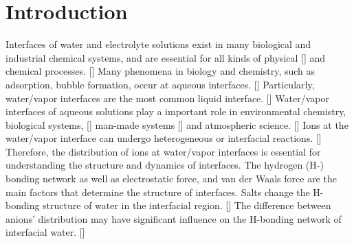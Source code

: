\chapter{Introduction}\label{CHAPETR_1}
Interfaces of water and electrolyte solutions exist in many biological and industrial chemical systems, and
are essential for all kinds of physical [\cite{Yamamoto2008, Salmeron2009,Balajka2018}] and chemical processes. [\cite{Tobias99,Benderskii00,Benderskii02}]
Many phenomena in biology and chemistry, such as adsorption,
bubble formation, occur at aqueous interfaces. [\cite{Ball2008}]
Particularly, water/vapor interfaces are the most common liquid interface. [\cite{Kuo2004b}] 
Water/vapor interfaces of aqueous solutions play a important role in environmental chemistry, biological systems, [\cite{ZhangLY09,Nostro12}] 
man-made systems [\cite{Richmond02,LiuH04,Asahi01}] and atmospheric science. [\cite{TianCS08,Irwin88}] 
Ions at the water/vapor interface can undergo heterogeneous or interfacial reactions. [\cite{HuJH95,LiuDF04,Clifford07,Manna13,Pillar2014}] 
Therefore, the distribution of ions at water/vapor interfaces is essential for understanding the structure and dynamics of interfaces. 
The hydrogen (H-) bonding network as well as electrostatic force, and van der Waals force are the main factors that determine the structure of interfaces. 
Salts change the H-bonding structure of water in the interfacial region. [\cite{EAR04,McLain2006,Ball2008}] 
The difference between anions' distribution may have significant influence on the H-bonding network of interfacial water. [\cite{Morita2008}]

